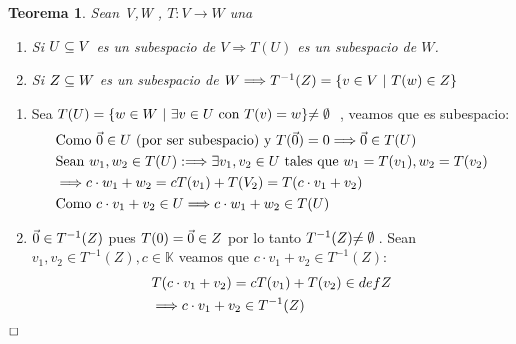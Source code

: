 \documentclass[]{article}
\newtheorem{theorem}{Teorema}
\newenvironment{proof}{\noindent{\bf Prueba:}}{$\hfill \Box$ \vspace{10pt}}
\newcommand{\K}{
    \mathbb{K}
}
\newcommand{\ida}{\Longrightarrow}
\begin{document}
\begin{theorem}
    Sean V,W \espvec , $T:V\rightarrow W$ una \tl
    \begin{enumerate}
        \item Si $\text{$U \subseteq V$}$ es un subespacio de $V \ida T(U)$ es un subespacio de $W$.
        \item Si $\text{$Z \subseteq W$}$ es un subespacio de $W \ida T^{-1}(Z)=\conjunto{v \in V \tq T(w)\in Z}$
    \end{enumerate}
\end{theorem}
\begin{proof}
    \begin{enumerate}
        \item Sea $\text{$T({U})$} = \text{$\{ {w \in W \text{ $|$ } \exists v \in U \text{ con } \text{$T({v})$}=w} \}$} \text{$\neq\emptyset$}\:$ , veamos
        que  es subespacio:
        \begin{align*}
            &\text{Como } \cero \in U \text{ (por ser subespacio) y } \T{\cero}=0 \ida \cero \in \T{U}\\
            &\text{Sean } w_1,w_2 \in \T{U}: \ida \exists v_1,v_2 \in U \text{ tales que } w_1=\T{v_1},w_2=\T{v_2}\\
            &\ida c\cdot w_1 + w_2 = c\T{v_1}+\T{V_2} = \T{c\cdot v_1 + v_2}\\
            &\text{Como } c\cdot v_1+v_2 \in U \ida c\cdot w_1 + w_2 \in \T{U}
        \end{align*}
        \item $\text{$\vec{0}$} \in T^{-1}(Z)$ pues $\text{$T({0})$} = \text{$\vec{0}$} \in Z$ por lo tanto $T^{-1}(Z) \text{$\neq\emptyset$}\:$.
        Sean $v_1,v_2 \in T^{-1}(Z) , c \in \K$ veamos que $c\cdot v_1 + v_2 \in T^{-1}(Z)$:
        \begin{align*}
            &\T{c\cdot v_1+v_2}=c\T{v_1}+\T{v_2} \in defZ\\
            &\ida c\cdot v_1+v_2 \in T^{-1}(Z)
        \end{align*}
    \end{enumerate}
\end{proof}
\end{document}
